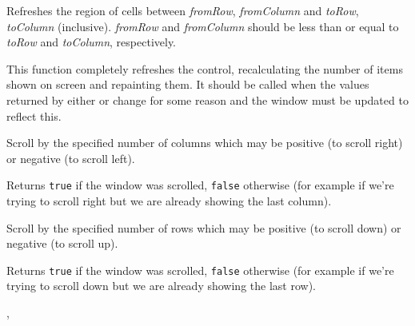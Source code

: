 Refreshes the region of cells between {\it fromRow}, {\it fromColumn} and
{\it toRow}, {\it toColumn} (inclusive). {\it fromRow} and {\it fromColumn}
should be less than or equal to {\it toRow} and {\it toColumn}, respectively.




\label{wxhvscrolledwindowrefreshall}


This function completely refreshes the control, recalculating the number of
items shown on screen and repainting them. It should be called when the values
returned by either  or 
 change for some
reason and the window must be updated to reflect this.


\label{wxhvscrolledwindowscrollcolumns}


Scroll by the specified number of columns which may be positive (to scroll
right) or negative (to scroll left).

Returns {\tt true} if the window was scrolled, {\tt false} otherwise (for
example if we're trying to scroll right but we are already showing the last
column).


\label{wxhvscrolledwindowscrollrows}


Scroll by the specified number of rows which may be positive (to scroll
down) or negative (to scroll up).

Returns {\tt true} if the window was scrolled, {\tt false} otherwise (for
example if we're trying to scroll down but we are already showing the last
row).


, 


\label{wxhvscrolledwindowscrollrowscolumns}


